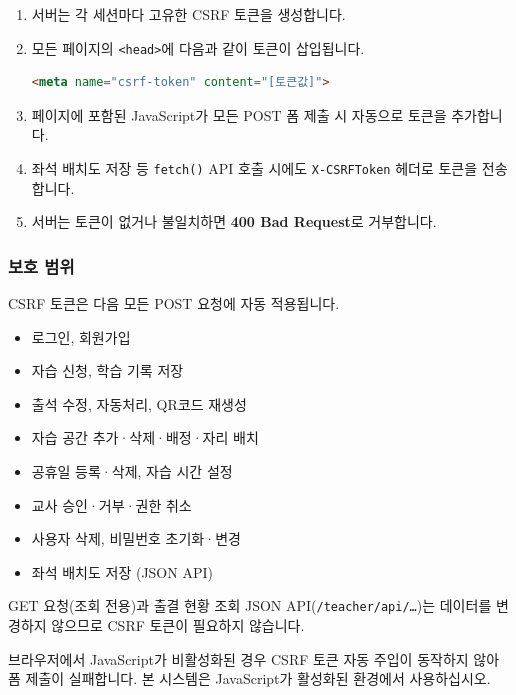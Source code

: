 \documentclass[a4paper,12pt]{article}
\begin{document}
\begin{enumerate}[leftmargin=1.5em]
    \item 서버는 각 세션마다 고유한 CSRF 토큰을 생성합니다.
    \item 모든 페이지의 \texttt{<head>}에 다음과 같이 토큰이 삽입됩니다.
\begin{lstlisting}[language=html]
<meta name="csrf-token" content="[토큰값]">
\end{lstlisting}
    \item 페이지에 포함된 JavaScript가 모든 POST 폼 제출 시 자동으로 토큰을 추가합니다.
    \item 좌석 배치도 저장 등 \texttt{fetch()} API 호출 시에도 \texttt{X-CSRFToken} 헤더로 토큰을 전송합니다.
    \item 서버는 토큰이 없거나 불일치하면 \textbf{400 Bad Request}로 거부합니다.
\end{enumerate}

\subsubsection{보호 범위}

CSRF 토큰은 다음 모든 POST 요청에 자동 적용됩니다.

\begin{itemize}[leftmargin=1.5em]
    \item 로그인, 회원가입
    \item 자습 신청, 학습 기록 저장
    \item 출석 수정, 자동처리, QR코드 재생성
    \item 자습 공간 추가·삭제·배정·자리 배치
    \item 공휴일 등록·삭제, 자습 시간 설정
    \item 교사 승인·거부·권한 취소
    \item 사용자 삭제, 비밀번호 초기화·변경
    \item 좌석 배치도 저장 (JSON API)
\end{itemize}

\begin{notebox}
  GET 요청(조회 전용)과 출결 현황 조회 JSON API(\texttt{/teacher/api/\ldots})는
  데이터를 변경하지 않으므로 CSRF 토큰이 필요하지 않습니다.
\end{notebox}

\begin{warnbox}
  브라우저에서 JavaScript가 비활성화된 경우 CSRF 토큰 자동 주입이 동작하지 않아
  폼 제출이 실패합니다. 본 시스템은 JavaScript가 활성화된 환경에서 사용하십시오.
\end{warnbox}
\end{document}
